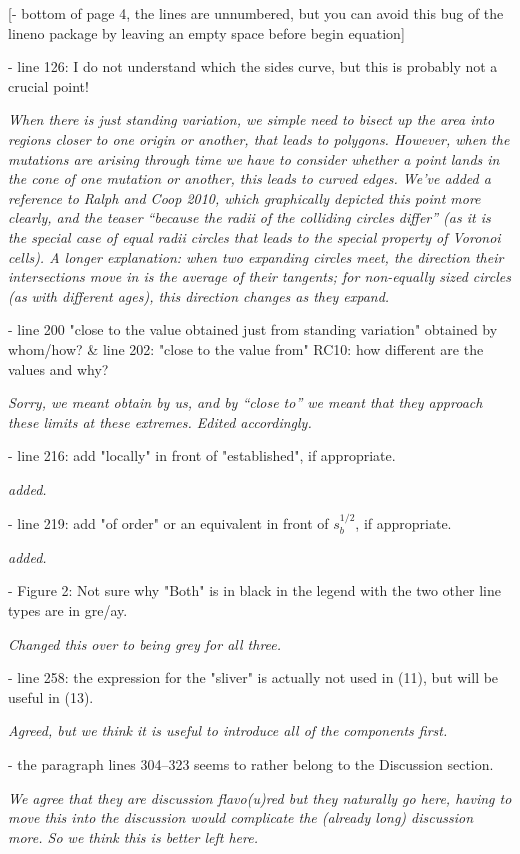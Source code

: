 \documentclass[12pt,letterpaper]{article}
\newcommand{\response}[1]{\emph{ \color{blue} #1}}
\begin{document}
[- bottom of page 4, the lines are unnumbered, but you can avoid this bug of the lineno package by leaving an empty space before begin equation]

- line 126: I do not understand which the sides curve, but this is probably not a crucial point!

\response{When there is just standing variation, we simple need to bisect up the area into regions closer to one origin or another, that leads to polygons. However, when the mutations are arising through time we have to consider whether a point lands in the cone of one mutation or another, this leads to curved edges. We've added a reference to Ralph and Coop 2010, which graphically depicted this point more clearly, and the teaser ``because the radii of the colliding circles differ'' (as it is the special case of equal radii circles that leads to the special property of Voronoi cells).  A longer explanation: when two expanding circles meet, the direction their intersections move in is the average of their tangents; for non-equally sized circles (as with different ages), this direction changes as they expand.}

- line 200 "close to the value obtained just from standing variation" obtained by whom/how? \&  line 202: "close to the value from" RC10: how different are the values and why?


\response{Sorry, we meant obtain by us, and by ``close to'' we meant that they approach these limits at these extremes. Edited accordingly.}


- line 216: add "locally" in front of "established", if appropriate.

\response{added.}

- line 219: add "of order" or an equivalent in front of $s_b^{1/2}$, if appropriate.

\response{added.}

- Figure 2: Not sure why "Both" is in black in the legend with the two other line types are in gre/ay.

\response{Changed this over to being grey for all three.}

- line 258: the expression for the "sliver" is actually not used in (11), but will be useful in (13).

\response{Agreed, but we think it is useful to introduce all of the components first.}

- the paragraph lines 304--323 seems to rather belong to the Discussion section.

\response{We agree that they are discussion flavo(u)red but they naturally go here, having to move this into the discussion would complicate the (already long) discussion more. So we think this is better left here.}
\end{document}

